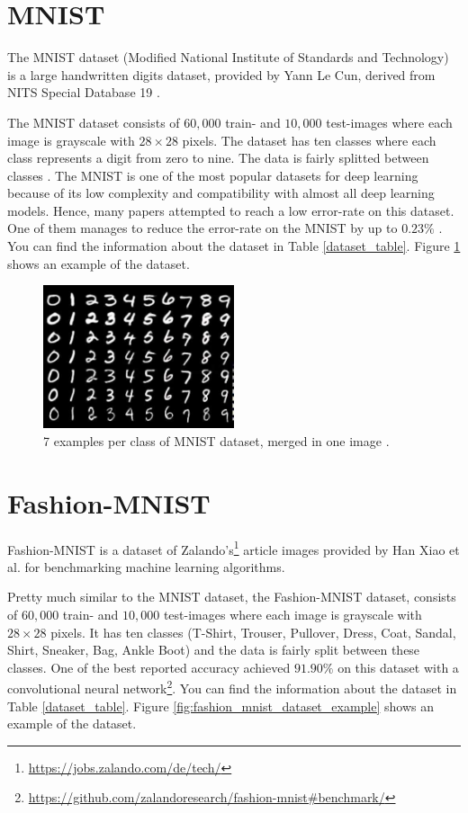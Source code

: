 \section{MNIST}
The MNIST dataset (Modified National Institute of Standards and Technology) is a large handwritten
digits dataset, provided by Yann Le Cun, derived from NITS Special Database 19 \cite{NIST}.

The MNIST dataset consists of $60,000$ train- and $10,000$ test-images where each image is grayscale
with $28 \times 28$ pixels. The dataset has ten classes where each class represents a digit from
zero to nine. The data is fairly
splitted between classes \cite{MNIST_data_reference}. The MNIST is one of the most popular datasets for
deep learning because of its low complexity and compatibility with almost all deep learning
models. Hence, many papers attempted to reach a low error-rate on this dataset. One of them manages
to reduce the error-rate on the MNIST by up to $0.23\%$ \cite{MNIST_best_result_reference}. You can
find the information about the dataset in Table
\ref{dataset_table}. Figure \ref{fig:mnist_dataset_example} shows an example of the dataset.

\begin{figure}
  \centering
  \label{fig:mnist_dataset_example}
  \includegraphics[width=0.5\textwidth]{fig/mnist}
  \caption{7 examples per class of MNIST dataset, merged in one image \cite{MNIST_dataset_example}.}
\end{figure}


\section{Fashion-MNIST}
Fashion-MNIST is a dataset of Zalando's\footnote{\url{https://jobs.zalando.com/de/tech/}}
article images provided by Han Xiao et al. \cite{Fashion_MNIST_reference} for benchmarking machine learning algorithms.

Pretty much similar to the MNIST dataset, the Fashion-MNIST dataset, consists of $60,000$ train- and
$10,000$ test-images where each image is grayscale
with $28 \times 28$ pixels. It has ten classes (T-Shirt, Trouser, Pullover, Dress, Coat,
Sandal, Shirt, Sneaker, Bag, Ankle Boot) and the data is fairly
split between these classes. One of the best reported accuracy achieved $91.90\%$ on this dataset
with a convolutional neural
network\footnote{\url{https://github.com/zalandoresearch/fashion-mnist\#benchmark/}}. You can
find the information about the dataset in Table
\ref{dataset_table}. Figure \ref{fig:fashion_mnist_dataset_example} shows an example of the dataset.


